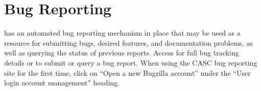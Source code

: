 
\section{Bug Reporting}

\hypre{} has an automated bug reporting mechanism in place that may be used 
as a resource for submitting bugs, desired features, and documentation
problems, as well as querying the status of previous reports.  Access
for full bug tracking details or to submit or query a bug report.
When using the CASC bug reporting site for the first time, click on
``Open a new Bugzilla account'' under the ``User login account
management'' heading.

